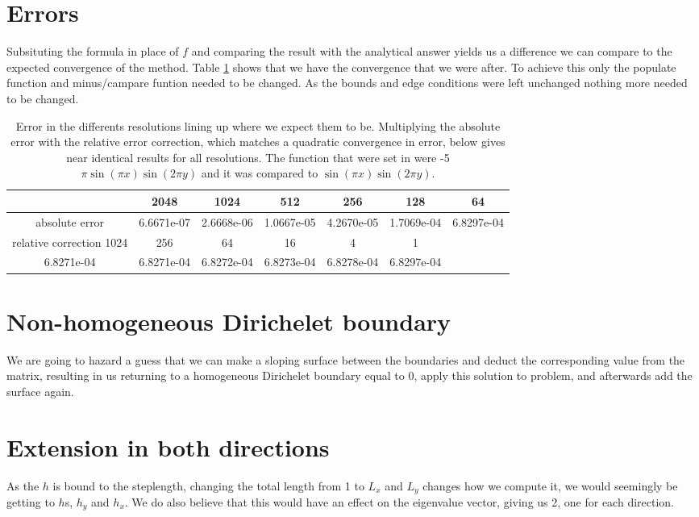 \section{Errors}
Subsituting the formula in place of $f$ and comparing the result with the analytical answer yields us a difference we can compare to the expected convergence of the method. Table \ref{tab:relerr} shows that we have the convergence that we were after. To achieve this only the populate function and minus/campare funtion needed to be changed. As the bounds and edge conditions were left unchanged nothing more needed to be changed.  

\begin{table}[t]
\caption{\label{tab:relerr}Error in the differents resolutions lining up where we expect them to be. Multiplying the absolute error with the relative error correction, which matches a quadratic convergence in error, below gives near identical results for all resolutions. The function that were set in were -5 $\pi \sin(\pi x ) \sin(2\pi y)$ and it was compared to $\sin(\pi x ) \sin(2\pi y)$. }
\begin{tabular}{|c|c|c|c|c|c|c|}
\hline 
 &  2048 & 1024 & 512 & 256 & 128 & 64 \\ 
\hline 
absolute error &6.6671e-07  & 2.6668e-06 &  1.0667e-05  & 4.2670e-05 &  1.7069e-04 &  6.8297e-04\\
\hline 
relative correction   1024 &   256   &  64   &  16  &    4   &   1\\
\hline 
 6.8271e-04 &  6.8271e-04 &  6.8272e-04 &  6.8273e-04 &  6.8278e-04  & 6.8297e-04\\
\hline 
\end{tabular}
\end{table} 

\section{Non-homogeneous Dirichelet boundary} 
We are going to hazard a guess that we can make a sloping surface between the boundaries and deduct the corresponding value from the matrix, resulting in us returning to a homogeneous Dirichelet boundary equal to 0, apply this solution to problem, and afterwards add the surface again. 

\section{Extension in both directions}
As the $h$ is bound to the steplength, changing the total length from 1 to $L_x$ and $L_y$ changes how we compute it, we would seemingly be getting to $h$s, $h_y$ and $h_x$. We do also believe that this would have an effect on the eigenvalue vector, giving us 2, one for each direction. 